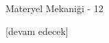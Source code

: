 \documentclass[12pt,fleqn]{article}\usepackage{../../common}
\begin{document}
Materyel Mekaniği - 12




















[devam edecek]
\end{document}
